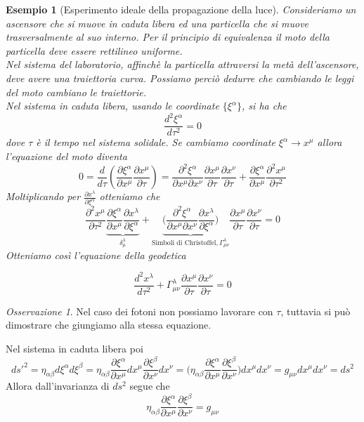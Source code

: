 \documentclass[10pt,a4paper]{article}
\theoremstyle{break}
\newtheorem{ex}{Esempio}
\theoremstyle{remark}
\newtheorem{oss}{Osservazione}
\theoremstyle{definition}
\begin{document}
\begin{ex}[Esperimento ideale della propagazione della luce]
	Consideriamo un ascensore che si muove in caduta libera ed una particella che si muove trasversalmente al suo interno. Per il principio di equivalenza il moto della particella deve essere rettilineo uniforme.
	\\
	Nel sistema del laboratorio, affinchè la particella attraversi la metà dell'ascensore, deve avere una traiettoria curva. Possiamo perciò dedurre che cambiando le leggi del moto cambiano le traiettorie.
	\\
	Nel sistema in caduta libera, usando le coordinate $\{\xi^\alpha\}$, si ha che
	\[
	\frac{d^2\xi^\alpha}{d\tau^2} = 0
	\]
	dove $\tau$ è il tempo nel sistema solidale. Se cambiamo coordinate $\xi^\alpha \to x^\mu$ allora l'equazione del moto diventa
	\[
	0 = \frac{d}{d\tau}(\frac{\partial\xi^\alpha}{\partial x^\mu} \frac{\partial x^\mu}{\partial \tau}) = \frac{\partial^2 \xi^\alpha}{\partial x^\mu \partial x^\nu} \frac{\partial x^\mu}{\partial \tau} \frac{\partial x^\nu}{\partial \tau} + \frac{\partial\xi^\alpha}{\partial x^\mu}\frac{\partial^2 x^\mu}{\partial \tau^2}	
	\]
	Moltiplicando per $\frac{\partial x^\lambda}{\partial \xi^\alpha}$ otteniamo che 
	\[
	\frac{\partial^2 x^\mu}{\partial \tau^2} \underbrace{ \frac{\partial\xi^\alpha}{\partial x^\mu}\frac{\partial x^\lambda}{\partial \xi^\alpha} }_{ \delta_\mu^\lambda } + \underbrace{\big( \frac{\partial^2 \xi^\alpha}{\partial x^\mu \partial x^\nu} \frac{\partial x^\lambda}{\partial \xi^\alpha} \big)}_{\text{Simboli di Christoffel}, \Gamma^\lambda_{\mu \nu} }  \frac{\partial x^\mu}{\partial \tau} \frac{\partial x^\nu}{\partial \tau} = 0
	\]
	Otteniamo così l'equazione della geodetica
	
	\[
	\boxed{\frac{d^2 x^\lambda}{d \tau^2} +  \Gamma^\lambda_{\mu \nu}\frac{\partial x^\mu}{\partial \tau} \frac{\partial x^\nu}{\partial \tau} = 0 }
	\]
\end{ex}

\begin{oss}
	Nel caso dei fotoni non possiamo lavorare con $\tau$, tuttavia si può dimostrare che giungiamo alla stessa equazione.
\end{oss}

Nel sistema in caduta libera poi
\[
ds'^2 = \eta_{\alpha \beta}d\xi^\alpha d\xi^\beta = \eta_{\alpha \beta} \frac{\partial\xi^\alpha}{\partial x^\mu} dx^\mu \frac{\partial\xi^\beta}{\partial x^\nu} dx^\nu = \big( \eta_{\alpha \beta} \frac{\partial\xi^\alpha}{\partial x^\mu}\frac{\partial\xi^\beta}{\partial x^\nu} \big) dx^\mu dx^\nu = g_{\mu \nu} dx^\mu dx^\nu = ds^2 
\]
Allora dall'invarianza di $ds^2$ segue che 
\[
\eta_{\alpha \beta} \frac{\partial\xi^\alpha}{\partial x^\mu}\frac{\partial\xi^\beta}{\partial x^\nu} = g_{\mu \nu}
\]
\end{document}
